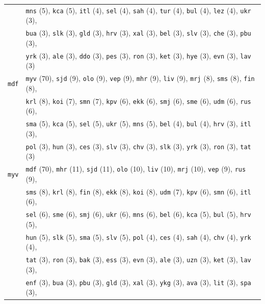 \begin{center}
\begin{longtable}{ll}
 & \texttt{mns} (5), \texttt{kca} (5), \texttt{itl} (4), \texttt{sel} (4), \texttt{sah} (4), \texttt{tur} (4), \texttt{bul} (4), \texttt{lez} (4), \texttt{ukr} (3),\\
 & \texttt{bua} (3), \texttt{slk} (3), \texttt{gld} (3), \texttt{hrv} (3), \texttt{xal} (3), \texttt{bel} (3), \texttt{slv} (3), \texttt{che} (3), \texttt{pbu} (3),\\
 & \texttt{yrk} (3), \texttt{ale} (3), \texttt{ddo} (3), \texttt{pes} (3), \texttt{ron} (3), \texttt{ket} (3), \texttt{hye} (3), \texttt{evn} (3), \texttt{lav} (3) \\
\texttt{mdf} & \texttt{myv} (70), \texttt{sjd} (9), \texttt{olo} (9), \texttt{vep} (9), \texttt{mhr} (9), \texttt{liv} (9), \texttt{mrj} (8), \texttt{sms} (8), \texttt{fin} (8), \\
 & \texttt{krl} (8), \texttt{koi} (7), \texttt{smn} (7), \texttt{kpv} (6), \texttt{ekk} (6), \texttt{smj} (6), \texttt{sme} (6), \texttt{udm} (6), \texttt{rus} (6), \\
 & \texttt{sma} (5), \texttt{kca} (5), \texttt{sel} (5), \texttt{ukr} (5), \texttt{mns} (5), \texttt{bel} (4), \texttt{bul} (4), \texttt{hrv} (3), \texttt{itl} (3), \\
 & \texttt{pol} (3), \texttt{hun} (3), \texttt{ces} (3), \texttt{slv} (3), \texttt{chv} (3), \texttt{slk} (3), \texttt{yrk} (3), \texttt{ron} (3), \texttt{tat} (3) \\
\texttt{myv} & \texttt{mdf} (70), \texttt{mhr} (11), \texttt{sjd} (11), \texttt{olo} (10), \texttt{liv} (10), \texttt{mrj} (10), \texttt{vep} (9), \texttt{rus} (9),\\
 & \texttt{sms} (8), \texttt{krl} (8), \texttt{fin} (8), \texttt{ekk} (8), \texttt{koi} (8), \texttt{udm} (7), \texttt{kpv} (6), \texttt{smn} (6), \texttt{itl} (6),\\
 & \texttt{sel} (6), \texttt{sme} (6), \texttt{smj} (6), \texttt{ukr} (6), \texttt{mns} (6), \texttt{bel} (6), \texttt{kca} (5), \texttt{bul} (5), \texttt{hrv} (5),\\
 & \texttt{hun} (5), \texttt{slk} (5), \texttt{sma} (5), \texttt{slv} (5), \texttt{pol} (4), \texttt{ces} (4), \texttt{sah} (4), \texttt{chv} (4), \texttt{yrk} (4),\\
 & \texttt{tat} (3), \texttt{ron} (3), \texttt{bak} (3), \texttt{ess} (3), \texttt{evn} (3), \texttt{ale} (3), \texttt{uzn} (3), \texttt{ket} (3), \texttt{lav} (3),\\
 & \texttt{enf} (3), \texttt{bua} (3), \texttt{pbu} (3), \texttt{gld} (3), \texttt{xal} (3), \texttt{ykg} (3), \texttt{ava} (3), \texttt{lit} (3), \texttt{spa} (3),\\

\end{longtable}
\end{center}
